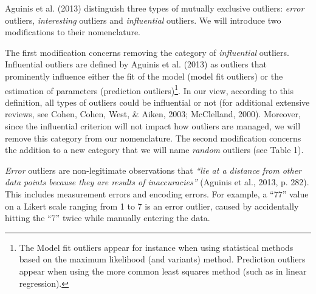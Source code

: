 \documentclass[man,floatsintext]{apa6}
\let\rmarkdownfootnote\footnote%
\def\footnote{\protect\rmarkdownfootnote}
\begin{document}
Aguinis et al. (2013) distinguish three types of mutually exclusive outliers: \emph{error} outliers, \emph{interesting} outliers and \emph{influential} outliers. We will introduce two modifications to their nomenclature.

The first modification concerns removing the category of \emph{influential} outliers. Influential outliers are defined by Aguinis et al. (2013) as outliers that prominently influence either the fit of the model (model fit outliers) or the estimation of parameters (prediction outliers)\footnote{The Model fit outliers appear for instance when using statistical methods based on the maximum likelihood (and variants) method. Prediction outliers appear when using the more common least squares method (such as in linear regression).}. In our view, according to this definition, all types of outliers could be influential or not (for additional extensive reviews, see Cohen, Cohen, West, \& Aiken, 2003; McClelland, 2000). Moreover, since the influential criterion will not impact how outliers are managed, we will remove this category from our nomenclature. The second modification concerns the addition to a new category that we will name \emph{random} outliers (see Table 1).

\emph{Error} outliers are non-legitimate observations that \emph{\enquote{lie at a distance from other data points because they are results of inaccuracies}} (Aguinis et al., 2013, p. 282). This includes measurement errors and encoding errors. For example, a \enquote{77} value on a Likert scale ranging from 1 to 7 is an error outlier, caused by accidentally hitting the \enquote{7} twice while manually entering the data.
\end{document}
